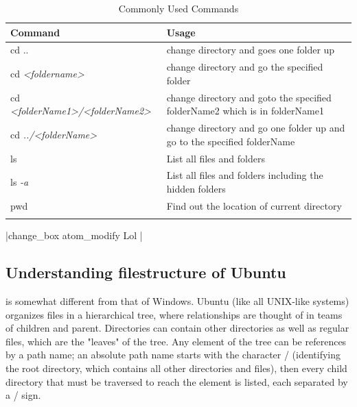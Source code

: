 \documentclass{tufte-book} %
\begin{document}
\begin{table}[center]
  \centering
  \begin{tabular}{ll}
    \toprule
    Command & Usage \\
    \midrule
    cd .. & change directory and goes one folder up \\
    cd \textit{<foldername>} & change directory and go the specified folder \\
    cd \textit{<folderName1>/<folderName2>} & change directory and goto the specified folderName2 which is in folderName1 \\
    cd \textit{../<folderName>} & change directory and go one folder up and go to the specified folderName \\
    ls & List all files and folders \\
    ls \textit{-a} & List all files and folders including the hidden folders \\
    pwd & Find out the location of current directory \\
    
    \bottomrule
  \caption{Commonly Used Commands}
     
  \end{tabular}
  \label{command0}

\end{table}

|change_box atom_modify Lol |

\subsection{Understanding filestructure of Ubuntu}
 is somewhat different from that of Windows. Ubuntu (like all UNIX-like systems) organizes files in a hierarchical tree, where relationships are thought of in teams of children and parent. Directories can contain other directories as well as regular files, which are the "leaves" of the tree. Any element of the tree can be references by a path name; an absolute path name starts with the character / (identifying the root directory, which contains all other directories and files), then every child directory that must be traversed to reach the element is listed, each separated by a / sign.
\end{document}
